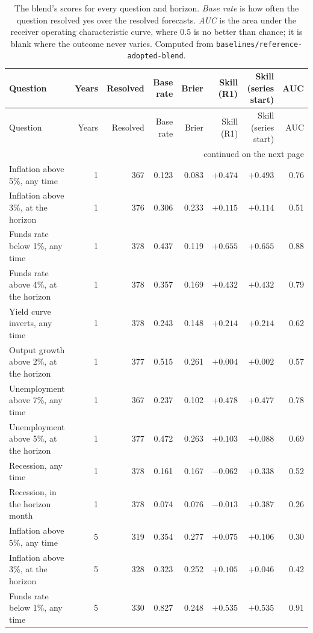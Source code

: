 \begin{longtable}{lrrrrrrr}
\caption{The blend's scores for every question and horizon. \emph{Base rate} is how often the question resolved yes over the resolved forecasts. \emph{AUC} is the area under the receiver operating characteristic curve, where 0.5 is no better than chance; it is blank where the outcome never varies. Computed from \texttt{baselines/reference-adopted-blend}.}\label{tab:metrics}\\
\toprule
Question & Years & Resolved & Base rate & Brier & Skill (R1) & Skill (series start) & AUC \\
\midrule
\endfirsthead
\toprule
Question & Years & Resolved & Base rate & Brier & Skill (R1) & Skill (series start) & AUC \\
\midrule
\endhead
\midrule
\multicolumn{8}{r}{\footnotesize continued on the next page}\\
\endfoot
\bottomrule
\endlastfoot
Inflation above 5\%, any time & 1 & 367 & 0.123 & 0.083 & $+0.474$ & $+0.493$ & 0.76 \\
Inflation above 3\%, at the horizon & 1 & 376 & 0.306 & 0.233 & $+0.115$ & $+0.114$ & 0.51 \\
Funds rate below 1\%, any time & 1 & 378 & 0.437 & 0.119 & $+0.655$ & $+0.655$ & 0.88 \\
Funds rate above 4\%, at the horizon & 1 & 378 & 0.357 & 0.169 & $+0.432$ & $+0.432$ & 0.79 \\
Yield curve inverts, any time & 1 & 378 & 0.243 & 0.148 & $+0.214$ & $+0.214$ & 0.62 \\
Output growth above 2\%, at the horizon & 1 & 377 & 0.515 & 0.261 & $+0.004$ & $+0.002$ & 0.57 \\
Unemployment above 7\%, any time & 1 & 367 & 0.237 & 0.102 & $+0.478$ & $+0.477$ & 0.78 \\
Unemployment above 5\%, at the horizon & 1 & 377 & 0.472 & 0.263 & $+0.103$ & $+0.088$ & 0.69 \\
Recession, any time & 1 & 378 & 0.161 & 0.167 & $-0.062$ & $+0.338$ & 0.52 \\
Recession, in the horizon month & 1 & 378 & 0.074 & 0.076 & $-0.013$ & $+0.387$ & 0.26 \\
Inflation above 5\%, any time & 5 & 319 & 0.354 & 0.277 & $+0.075$ & $+0.106$ & 0.30 \\
Inflation above 3\%, at the horizon & 5 & 328 & 0.323 & 0.252 & $+0.105$ & $+0.046$ & 0.42 \\
Funds rate below 1\%, any time & 5 & 330 & 0.827 & 0.248 & $+0.535$ & $+0.535$ & 0.91 \\

\end{longtable}
